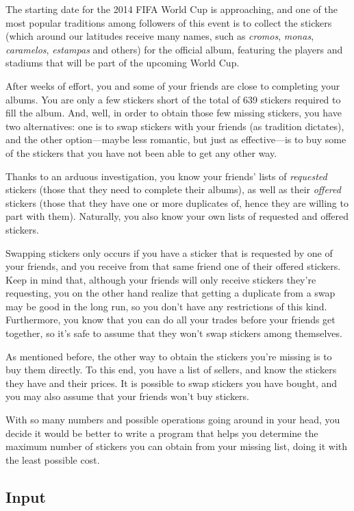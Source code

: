 The starting date for the 2014 FIFA World Cup is approaching, and one of
the most popular traditions among followers of this event is to collect
the stickers (which around our latitudes receive many names, such as
\emph{cromos}, \emph{monas}, \emph{caramelos}, \emph{estampas} and
others) for the official album, featuring the players and stadiums that
will be part of the upcoming World Cup.

After weeks of effort, you and some of your friends are close to
completing your albums. You are only a few stickers short of the total
of 639 stickers required to fill the album. And, well, in order to
obtain those few missing stickers, you have two alternatives: one is to
swap stickers with your friends (as tradition dictates), and the other
option---maybe less romantic, but just as effective---is to buy some of
the stickers that you have not been able to get any other way.

Thanks to an arduous investigation, you know your friends' lists of
\emph{requested} stickers (those that they need to complete their
albums), as well as their \emph{offered} stickers (those that they have
one or more duplicates of, hence they are willing to part with them).
Naturally, you also know your own lists of requested and offered
stickers.

Swapping stickers only occurs if you have a sticker that is requested by
one of your friends, and you receive from that same friend one of their
offered stickers. Keep in mind that, although your friends will only
receive stickers they're requesting, you on the other hand realize that
getting a duplicate from a swap may be good in the long run, so you
don't have any restrictions of this kind. Furthermore, you know that you
can do all your trades before your friends get together, so it's safe to
assume that they won't swap stickers among themselves.

As mentioned before, the other way to obtain the stickers you're missing
is to buy them directly. To this end, you have a list of sellers, and
know the stickers they have and their prices. It is possible to swap
stickers you have bought, and you may also assume that your friends
won't buy stickers.

With so many numbers and possible operations going around in your head,
you decide it would be better to write a program that helps you
determine the maximum number of stickers you can obtain from your
missing list, doing it with the least possible cost.

\subsection{Input}\label{input}

